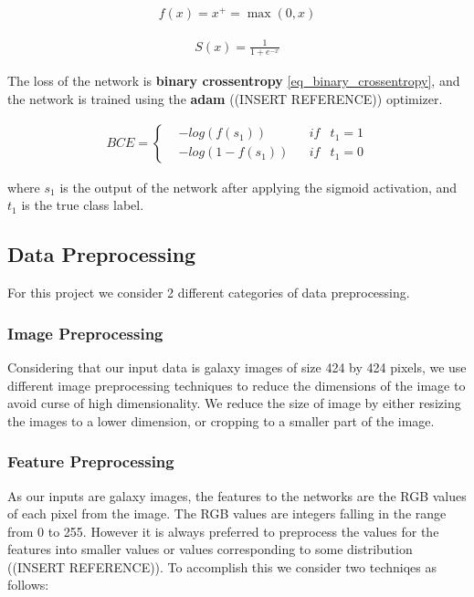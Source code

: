 \documentclass{article}
\begin{document}
\begin{equation}
\begin{aligned}  f(x)=x^{+}=\max (0, x) \end{aligned}
\label{eq_relu}
\end{equation}


\begin{equation}
\begin{aligned}  S(x)=\frac{1}{1+e^{-x}} \end{aligned}
\label{eq_sigmoid}
\end{equation}

The loss of the network is \textbf{binary crossentropy} \eqref{eq_binary_crossentropy}, and the network is trained using the \textbf{adam} ((INSERT REFERENCE)) optimizer.

\begin{equation}
\begin{aligned}  BCE = \left\{\begin{matrix} & - log(f(s_{1})) & & if & t_{1} = 1 \\ & - log(1 - f(s_{1})) & & if & t_{1} = 0 \end{matrix}\right. \end{aligned}
\label{eq_binary_crossentropy}
\end{equation}

where $s_1$ is the output of the network after applying the sigmoid activation, and $t_1$ is the true class label.

\subsection{Data Preprocessing}

For this project we consider 2 different categories of data preprocessing.

\subsubsection{Image Preprocessing}
Considering that our input data is galaxy images of size 424 by 424 pixels, we use different image preprocessing techniques to reduce the dimensions of the image to avoid curse of high dimensionality. We reduce the size of image by either resizing the images to a lower dimension, or cropping to a smaller part of the image.

\subsubsection{Feature Preprocessing}
As our inputs are galaxy images, the features to the networks are the RGB values of each pixel from the image. The RGB values are integers falling in the range from 0 to 255. However it is always preferred to preprocess the values for the features into smaller values or values corresponding to some distribution ((INSERT REFERENCE)). To accomplish this we consider two techniqes as follows:
\end{document}
